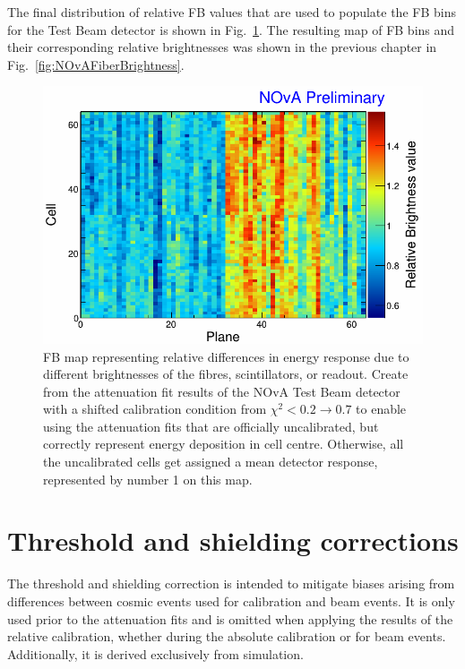 The final distribution of relative \gls{FB} values that are used to populate the \gls{FB} bins for the Test Beam detector is shown in Fig.~\ref{fig:TBFiberBrightnessMap}. The resulting map of \gls{FB} bins and their corresponding relative brightnesses was shown in the previous chapter in Fig.~\ref{fig:NOvAFiberBrightness}.

\begin{figure}[hbtp]
\centering
\includegraphics[width=.8\textwidth]{Plots/TBCalibration/TBFiberBrightnessMap.png}
\caption[Fibre Brightness map for the Test Beam detector]{\acrshort{FB} map representing relative differences in energy response due to different brightnesses of the fibres, scintillators, or readout. Create from the attenuation fit results of the \acrshort{NOvA} Test Beam detector with a shifted calibration condition from $\chi^2<0.2\rightarrow 0.7$ to enable using the attenuation fits that are officially uncalibrated, but correctly represent energy deposition in cell centre. Otherwise, all the uncalibrated cells get assigned a mean detector response, represented by number 1 on this map.}
\label{fig:TBFiberBrightnessMap}
\end{figure}

\section{Threshold and shielding corrections}\label{sec:TBThresholdCorrection}
The threshold and shielding correction is intended to mitigate biases arising from differences between cosmic events used for calibration and beam events. It is only used prior to the attenuation fits and is omitted when applying the results of the relative calibration, whether during the absolute calibration or for beam events. Additionally, it is derived exclusively from simulation.

